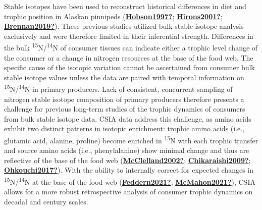 \documentclass [11pt, proquest] {uwthesis}[2015/03/03]
\begin{document}
Stable isotopes have been used to reconstruct historical differences in diet and trophic position in Alaskan pinnipeds (\protect\hyperlink{ref-Hobson1997}{\textbf{Hobson1997?}}; \protect\hyperlink{ref-Hirons2001}{\textbf{Hirons2001?}}; \protect\hyperlink{ref-Brennan2019}{\textbf{Brennan2019?}}). These previous studies utilized bulk stable isotope analysis exclusively and were therefore limited in their inferential strength. Differences in the bulk \textsuperscript{15}N/\textsuperscript{14}N of consumer tissues can indicate either a trophic level change of the consumer or a change in nitrogen resources at the base of the food web. The specific cause of the isotopic variation cannot be ascertained from consumer bulk stable isotope values unless the data are paired with temporal information on \textsuperscript{15}N/\textsuperscript{14}N in primary producers. Lack of consistent, concurrent sampling of nitrogen stable isotope composition of primary producers therefore presents a challenge for previous long-term studies of the trophic dynamics of consumers from bulk stable isotope data. CSIA data address this challenge, as amino acids exhibit two distinct patterns in isotopic enrichment: trophic amino acids (i.e., glutamic acid, alanine, proline) become enriched in \textsuperscript{15}N with each trophic transfer and source amino acids (i.e., phenylalanine) show minimal change and thus are reflective of the base of the food web (\protect\hyperlink{ref-McClelland2002}{\textbf{McClelland2002?}}; \protect\hyperlink{ref-Chikaraishi2009}{\textbf{Chikaraishi2009?}}; \protect\hyperlink{ref-Ohkouchi2017}{\textbf{Ohkouchi2017?}}). With the ability to internally correct for expected changes in \textsuperscript{15}N/\textsuperscript{14}N at the base of the food web (\protect\hyperlink{ref-Feddern2021}{\textbf{Feddern2021?}}; \protect\hyperlink{ref-McMahon2021}{\textbf{McMahon2021?}}), CSIA allows for a more robust retrospective analysis of consumer trophic dynamics on decadal and century scales.
\end{document}
